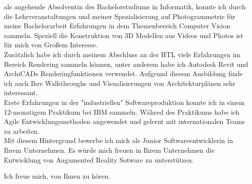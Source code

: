 \documentclass[11pt,stdletter,sigleft,dateno]{newlfm}
\begin{document}
\begin{newlfm}
als angehende Absolventin des Bachelorstudiums in Informatik, konnte ich durch die Lehrveranstaltungen und meiner Spezialisierung auf Photogrammetrie für meine Bachelorarbeit Erfahrungen in dem Themenbereich Computer Vision sammeln. Speziell die Konstruktion von 3D Modellen aus Videos und Photos ist für mich von Großem Interesse.\\
Zusätzlich habe ich durch meinem Abschluss an der HTL viele Erfahrungen im Bereich Rendering sammeln können, unter anderem habe ich Autodesk Revit und ArchiCADs Renderingfunktionen verwendet. Aufgrund diesem Ausbildung finde ich auch Ihre Walkthroughs und Visualisierungen von Architekturplänen sehr interessant.\\
Erste Erfahrungen in der "industriellen" Softwareproduktion konnte ich in einem 12-monatigem Praktikum bei IBM sammeln. Währed des Praktikums habe ich Agile Entwicklungsmethoden angewendet und gelernt mit internationalen Teams zu arbeiten.\\

Mit diesem Hintergrund bewerbe ich mich als Junior Softwareentwicklerin in Ihrem Unternehmen. Es würde mich freuen in Ihrem Unternehmen die Entwicklung von Augumented Reality Sotware zu unterstützen.

Ich freue mich, von Ihnen zu hören.\\
\end{newlfm}
\end{document}
